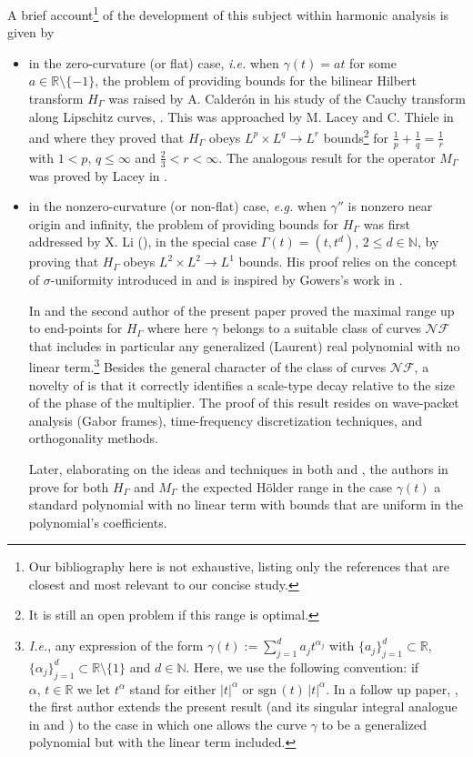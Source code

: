 \documentclass{amsart}
\newcommand{\R}{\mathbb{R}}
\newcommand{\N}{\mathbb{N}}
\def\n{\mathcal{N}}
\def\f{\mathcal{F}}
\def\a{\alpha}
\def\G{\Gamma}
\newcommand{\g}{\gamma}
\theoremstyle{definition}
\theoremstyle{remark}
\numberwithin{equation}{section}
\begin{document}
A brief account\footnote{Our bibliography here is not exhaustive, listing only the references that are closest and most relevant to our concise study.} of the development of this subject within harmonic analysis is given by
\begin{itemize}
\item in the zero-curvature (or flat) case, \emph{i.e.} when $\g(t)=a t$ for some $a\in\R\setminus\{-1\}$, the problem of providing bounds for the bilinear Hilbert transform $H_{\Gamma}$ was raised by A. Calder\'on in his study of the Cauchy transform along Lipschitz curves, \cite{Cal}. This was approached by M. Lacey and C. Thiele in  \cite{lt1} and \cite{lt2} where they proved that $H_{\Gamma}$ obeys $L^p\times L^q \to L^r$ bounds\footnote{It is still an open problem if this range is optimal.} for $\frac{1}{p}+\frac{1}{q}=\frac{1}{r}$ with $1<p,\,q\leq \infty$ and $\frac{2}{3}<r<\infty$. The analogous result for the operator $M_{\Gamma}$ was proved by Lacey in \cite{la3}.

\item  in the nonzero-curvature (or non-flat) case, \emph{e.g.} when $\g''$ is nonzero near origin and infinity,  the problem of providing bounds for $H_{\Gamma}$ was first addressed by X. Li (\cite{li}), in the special case $\Gamma(t) = (t, t^d)$, $2 \leq d \in \mathbb N$, by proving that $H_{\Gamma}$ obeys $L^{2}\times L^{2} \to L^{1}$ bounds. His proof relies on the concept of $\sigma$-uniformity introduced in \cite{cltt} and is inspired by  Gowers's work in \cite{gowers}.

    In \cite{lie2015boundedness} and \cite{lie2015triangle} the second author of the present paper proved the maximal range up to end-points for $H_{\G}$ where here $\g$ belongs to a suitable class of curves $\n\f$ that includes in particular any generalized (Laurent) real polynomial with no linear term.\footnote{\emph{I.e.}, any expression of the form $\g(t):=\sum_{j=1}^d a_j t^{\a_j}$ with $\{a_j\}_{j=1}^{d}\subset\R$, $\{\a_j\}_{j=1}^{d}\subset\R\setminus\{1\}$ and $d\in\N$. Here, we use the following convention: if $\a,\,t\in \R$ we let $t^{\a}$ stand for either $|t|^{\a}$ or $\textrm{sgn}\, (t)\, |t|^{\a}$. In a follow up paper, \cite{AG}, the first author extends the present result (and its singular integral analogue in \cite{lie2015boundedness} and \cite{lie2015triangle}) to the case in which one allows the curve $\g$ to be a generalized polynomial but with the linear term included.} Besides the general character of the class of curves $\n\f$, a novelty of \cite{lie2015boundedness}  is that it correctly identifies a scale-type decay relative to the size of the phase of the multiplier. The proof of this result resides on wave-packet analysis (Gabor frames), time-frequency discretization techniques, and orthogonality methods.

    Later, elaborating on the ideas and techniques in both \cite{li} and \cite{lie2015boundedness}, the authors in \cite{liXiao2016uniform} prove for both $H_{\Gamma}$  and $M_{\Gamma}$ the expected H\"older range in the case $\g(t)$ a standard polynomial with no linear term with bounds that are uniform in the polynomial's coefficients.
\end{itemize}
\end{document}
